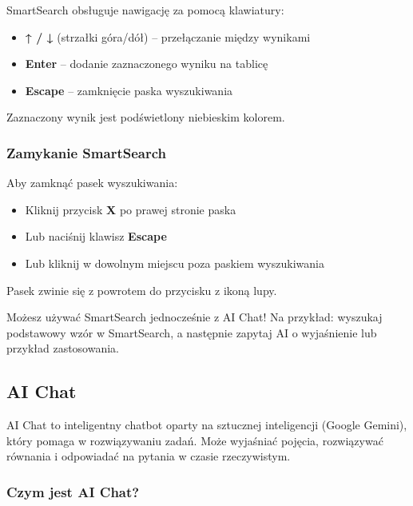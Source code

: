 \documentclass[12pt,a4paper]{article}
\begin{document}
SmartSearch obsługuje nawigację za pomocą klawiatury:

\begin{itemize}
    \item \textbf{↑ / ↓} (strzałki góra/dół) -- przełączanie między wynikami
    \item \textbf{Enter} -- dodanie zaznaczonego wyniku na tablicę
    \item \textbf{Escape} -- zamknięcie paska wyszukiwania
\end{itemize}

Zaznaczony wynik jest podświetlony niebieskim kolorem.

\subsubsection{Zamykanie SmartSearch}

Aby zamknąć pasek wyszukiwania:

\begin{itemize}
    \item Kliknij przycisk \textbf{X} po prawej stronie paska
    \item Lub naciśnij klawisz \textbf{Escape}
    \item Lub kliknij w dowolnym miejscu poza paskiem wyszukiwania
\end{itemize}

Pasek zwinie się z powrotem do przycisku z ikoną lupy.

\begin{tcolorbox}[colback=green!5!white,colframe=green!75!black,title=\faLightbulb\ Pro Tip]
Możesz używać SmartSearch jednocześnie z AI Chat! Na przykład: wyszukaj podstawowy wzór w SmartSearch, a następnie zapytaj AI o wyjaśnienie lub przykład zastosowania.
\end{tcolorbox}

\subsection{AI Chat}

AI Chat to inteligentny chatbot oparty na sztucznej inteligencji (Google Gemini), który pomaga w rozwiązywaniu zadań. Może wyjaśniać pojęcia, rozwiązywać równania i odpowiadać na pytania w czasie rzeczywistym.

\subsubsection{Czym jest AI Chat?}
\end{document}
